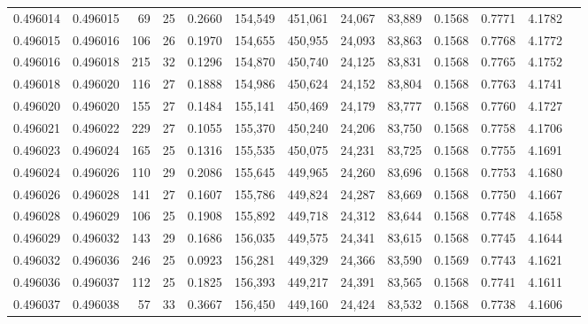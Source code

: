 \begin{tabular}{rrrrrrrrrrrrr}
0.496014 & 0.496015 &  69 &  25 &                                     0.2660 & 154,549 & 451,061 &  24,067 &  83,889 & 0.1568 & 0.7771 & 4.1782 \\
0.496015 & 0.496016 & 106 &  26 &                                     0.1970 & 154,655 & 450,955 &  24,093 &  83,863 & 0.1568 & 0.7768 & 4.1772 \\
0.496016 & 0.496018 & 215 &  32 &                                     0.1296 & 154,870 & 450,740 &  24,125 &  83,831 & 0.1568 & 0.7765 & 4.1752 \\
0.496018 & 0.496020 & 116 &  27 &                                     0.1888 & 154,986 & 450,624 &  24,152 &  83,804 & 0.1568 & 0.7763 & 4.1741 \\
0.496020 & 0.496020 & 155 &  27 &                                     0.1484 & 155,141 & 450,469 &  24,179 &  83,777 & 0.1568 & 0.7760 & 4.1727 \\
0.496021 & 0.496022 & 229 &  27 &                                     0.1055 & 155,370 & 450,240 &  24,206 &  83,750 & 0.1568 & 0.7758 & 4.1706 \\
0.496023 & 0.496024 & 165 &  25 &                                     0.1316 & 155,535 & 450,075 &  24,231 &  83,725 & 0.1568 & 0.7755 & 4.1691 \\
0.496024 & 0.496026 & 110 &  29 &                                     0.2086 & 155,645 & 449,965 &  24,260 &  83,696 & 0.1568 & 0.7753 & 4.1680 \\
0.496026 & 0.496028 & 141 &  27 &                                     0.1607 & 155,786 & 449,824 &  24,287 &  83,669 & 0.1568 & 0.7750 & 4.1667 \\
0.496028 & 0.496029 & 106 &  25 &                                     0.1908 & 155,892 & 449,718 &  24,312 &  83,644 & 0.1568 & 0.7748 & 4.1658 \\
0.496029 & 0.496032 & 143 &  29 &                                     0.1686 & 156,035 & 449,575 &  24,341 &  83,615 & 0.1568 & 0.7745 & 4.1644 \\
0.496032 & 0.496036 & 246 &  25 &                                     0.0923 & 156,281 & 449,329 &  24,366 &  83,590 & 0.1569 & 0.7743 & 4.1621 \\
0.496036 & 0.496037 & 112 &  25 &                                     0.1825 & 156,393 & 449,217 &  24,391 &  83,565 & 0.1568 & 0.7741 & 4.1611 \\
0.496037 & 0.496038 &  57 &  33 &                                     0.3667 & 156,450 & 449,160 &  24,424 &  83,532 & 0.1568 & 0.7738 & 4.1606 \\

\end{tabular}
